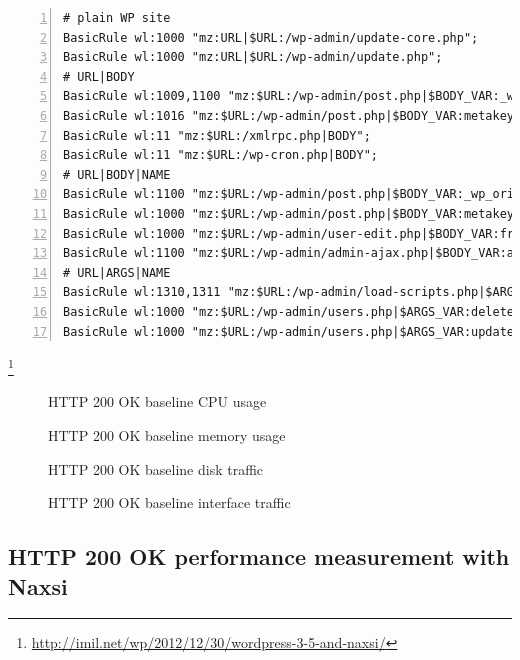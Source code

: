 \documentclass[Measurement results]{subfiles}
\begin{document}
\begin{lstlisting}[frame=single,caption=/etc/nginx/nbs.rules,backgroundcolor=\color{gray},breaklines=true,numbers=left,]
# plain WP site
BasicRule wl:1000 "mz:URL|$URL:/wp-admin/update-core.php";
BasicRule wl:1000 "mz:URL|$URL:/wp-admin/update.php";
# URL|BODY
BasicRule wl:1009,1100 "mz:$URL:/wp-admin/post.php|$BODY_VAR:_wp_http_referer";
BasicRule wl:1016 "mz:$URL:/wp-admin/post.php|$BODY_VAR:metakeyselect";
BasicRule wl:11 "mz:$URL:/xmlrpc.php|BODY";
BasicRule wl:11 "mz:$URL:/wp-cron.php|BODY";
# URL|BODY|NAME
BasicRule wl:1100 "mz:$URL:/wp-admin/post.php|$BODY_VAR:_wp_original_http_referer|NAME";
BasicRule wl:1000 "mz:$URL:/wp-admin/post.php|$BODY_VAR:metakeyselect|NAME";
BasicRule wl:1000 "mz:$URL:/wp-admin/user-edit.php|$BODY_VAR:from|NAME";
BasicRule wl:1100 "mz:$URL:/wp-admin/admin-ajax.php|$BODY_VAR:attachment%5burl%5d|NAME";
# URL|ARGS|NAME
BasicRule wl:1310,1311 "mz:$URL:/wp-admin/load-scripts.php|$ARGS_VAR:load[]|NAME";
BasicRule wl:1000 "mz:$URL:/wp-admin/users.php|$ARGS_VAR:delete_count|NAME";
BasicRule wl:1000 "mz:$URL:/wp-admin/users.php|$ARGS_VAR:update|NAME";
\end{lstlisting}\footnote{\url{http://imil.net/wp/2012/12/30/wordpress-3-5-and-naxsi/}}

\begin{figure}[H]
\centering
\caption{HTTP 200 OK baseline CPU usage}
\label{fig:Baseline Nginx CPU usage}
\end{figure}

\begin{figure}[H]
\centering
\caption{HTTP 200 OK baseline memory usage}
\label{fig:Baseline Nginx memory usage}
\end{figure}

\begin{figure}[H]
\centering
\caption{HTTP 200 OK baseline disk traffic}
\label{fig:Baseline Nginx disk traffic}
\end{figure}

\begin{figure}[H]
\centering
\caption{HTTP 200 OK baseline interface traffic}
\label{fig:Baseline Nginx interface traffic}
\end{figure}


\subsection{HTTP 200 OK performance measurement with Naxsi}
\end{document}
